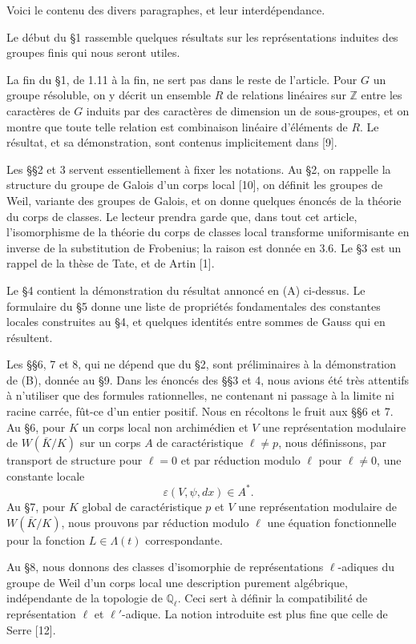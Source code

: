 \documentclass[10pt]{article}
\newcommand{\Q}{\mathbb Q}
\newcommand{\Z}{\mathbb Z}
\begin{document}
Voici le contenu des divers paragraphes, et leur interdépendance.

Le début du §1 rassemble quelques résultats sur les représentations induites des groupes finis qui nous seront utiles.

La fin du §1, de 1.11 à la fin, ne sert pas dans le reste de l'article. Pour \(G\) un groupe résoluble, on y décrit un ensemble \(R\) de relations linéaires sur \(\Z\) entre les caractères de \(G\) induits par des caractères de dimension un de sous-groupes, et on montre que toute telle relation est combinaison linéaire d'éléments de \(R\). Le résultat, et sa démonstration, sont contenus implicitement dans [9].

Les §§2 et 3 servent essentiellement à fixer les notations. Au §2, on rappelle la structure du groupe de Galois d'un corps local [10], on définit les groupes de Weil, variante des groupes de Galois, et on donne quelques énoncés de la théorie du corps de classes. Le lecteur prendra garde que, dans tout cet article, l'isomorphisme de la théorie du corps de classes local transforme uniformisante en inverse de la substitution de Frobenius; la raison est donnée en 3.6. Le §3 est un rappel de la thèse de Tate, et de Artin [1].

Le §4 contient la démonstration du résultat annoncé en (A) ci-dessus. Le formulaire du §5 donne une liste de propriétés fondamentales des constantes locales construites au §4, et quelques identités entre sommes de Gauss qui en résultent.

Les §§6, 7 et 8, qui ne dépend que du §2, sont préliminaires à la démonstration de (B), donnée au §9. Dans les énoncés des §§3 et 4, nous avions été très attentifs à n'utiliser que des formules rationnelles, ne contenant ni passage à la limite ni racine carrée, fût-ce d'un entier positif. Nous en récoltons le fruit aux §§6 et 7. Au §6, pour \(K\) un corps local non archimédien et \(V\) une représentation modulaire de \(W(\overline K/K)\) sur un corps \(A\) de caractéristique \(\ell\ne p\), nous définissons, par transport de structure pour \(\ell=0\) et par réduction modulo \(\ell\) pour \(\ell\ne0\), une constante locale
\[
\varepsilon(V,\psi,dx)\in A^*.
\]
Au §7, pour \(K\) global de caractéristique \(p\) et \(V\) une représentation modulaire de \(W(\overline K/K)\), nous prouvons par réduction modulo \(\ell\) une équation fonctionnelle pour la fonction \(L\in \Lambda(t)\) correspondante.

Au §8, nous donnons des classes d'isomorphie de représentations \(\ell\)-adiques du groupe de Weil d'un corps local une description purement algébrique, indépendante de la topologie de \(\Q_\ell\). Ceci sert à définir la compatibilité de représentation \(\ell\) et \(\ell'\)-adique. La notion introduite est plus fine que celle de Serre [12].
\end{document}

